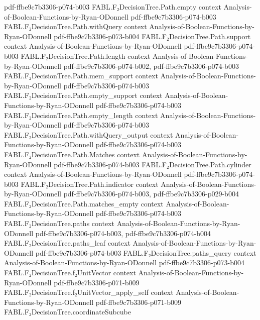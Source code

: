 \begin{theorem}
  {pdf-ffbe9c7b3306-p074-b003}
\proofstep
  {FABL.F₂DecisionTree.Path.empty}
  {context}
  {Analysis-of-Boolean-Functions-by-Ryan-ODonnell}
  {pdf-ffbe9c7b3306-p074-b003}
\proofstep
  {FABL.F₂DecisionTree.Path.withQuery}
  {context}
  {Analysis-of-Boolean-Functions-by-Ryan-ODonnell}
  {pdf-ffbe9c7b3306-p073-b004}
\proofstep
  {FABL.F₂DecisionTree.Path.support}
  {context}
  {Analysis-of-Boolean-Functions-by-Ryan-ODonnell}
  {pdf-ffbe9c7b3306-p074-b003}
\proofstep
  {FABL.F₂DecisionTree.Path.length}
  {context}
  {Analysis-of-Boolean-Functions-by-Ryan-ODonnell}
  {pdf-ffbe9c7b3306-p074-b002,
    pdf-ffbe9c7b3306-p074-b003}
\proofstep
  {FABL.F₂DecisionTree.Path.mem_support}
  {context}
  {Analysis-of-Boolean-Functions-by-Ryan-ODonnell}
  {pdf-ffbe9c7b3306-p074-b003}
\proofstep
  {FABL.F₂DecisionTree.Path.empty_support}
  {context}
  {Analysis-of-Boolean-Functions-by-Ryan-ODonnell}
  {pdf-ffbe9c7b3306-p074-b003}
\proofstep
  {FABL.F₂DecisionTree.Path.empty_length}
  {context}
  {Analysis-of-Boolean-Functions-by-Ryan-ODonnell}
  {pdf-ffbe9c7b3306-p074-b003}
\proofstep
  {FABL.F₂DecisionTree.Path.withQuery_output}
  {context}
  {Analysis-of-Boolean-Functions-by-Ryan-ODonnell}
  {pdf-ffbe9c7b3306-p074-b003}
\proofstep
  {FABL.F₂DecisionTree.Path.Matches}
  {context}
  {Analysis-of-Boolean-Functions-by-Ryan-ODonnell}
  {pdf-ffbe9c7b3306-p074-b003}
\proofstep
  {FABL.F₂DecisionTree.Path.cylinder}
  {context}
  {Analysis-of-Boolean-Functions-by-Ryan-ODonnell}
  {pdf-ffbe9c7b3306-p074-b003}
\proofstep
  {FABL.F₂DecisionTree.Path.indicator}
  {context}
  {Analysis-of-Boolean-Functions-by-Ryan-ODonnell}
  {pdf-ffbe9c7b3306-p074-b003,
    pdf-ffbe9c7b3306-p029-b004}
\proofstep
  {FABL.F₂DecisionTree.Path.matches_empty}
  {context}
  {Analysis-of-Boolean-Functions-by-Ryan-ODonnell}
  {pdf-ffbe9c7b3306-p074-b003}
\proofstep
  {FABL.F₂DecisionTree.paths}
  {context}
  {Analysis-of-Boolean-Functions-by-Ryan-ODonnell}
  {pdf-ffbe9c7b3306-p074-b003,
    pdf-ffbe9c7b3306-p074-b004}
\proofstep
  {FABL.F₂DecisionTree.paths_leaf}
  {context}
  {Analysis-of-Boolean-Functions-by-Ryan-ODonnell}
  {pdf-ffbe9c7b3306-p074-b003}
\proofstep
  {FABL.F₂DecisionTree.paths_query}
  {context}
  {Analysis-of-Boolean-Functions-by-Ryan-ODonnell}
  {pdf-ffbe9c7b3306-p073-b004}
\proofstep
  {FABL.F₂DecisionTree.f₂UnitVector}
  {context}
  {Analysis-of-Boolean-Functions-by-Ryan-ODonnell}
  {pdf-ffbe9c7b3306-p071-b009}
\proofstep
  {FABL.F₂DecisionTree.f₂UnitVector_apply_self}
  {context}
  {Analysis-of-Boolean-Functions-by-Ryan-ODonnell}
  {pdf-ffbe9c7b3306-p071-b009}
\proofstep
  {FABL.F₂DecisionTree.coordinateSubcube}

\end{theorem}
